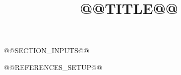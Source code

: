 \documentclass[conference]{IEEEtran}
\title{@@TITLE@@}
\begin{document}
\maketitle




@@SECTION_INPUTS@@

@@REFERENCES_SETUP@@


\end{document}
